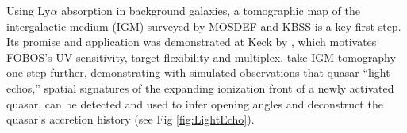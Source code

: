 Using Ly$\alpha$ absorption in background galaxies, a tomographic map
of the intergalactic medium (IGM) surveyed by MOSDEF and KBSS is a
key first step. Its promise and application was demonstrated at Keck
by \citet{lee14}, which motivates FOBOS's UV sensitivity, target
flexibility and multiplex. \citet{2018arXiv181005156S} take IGM
tomography one step further, demonstrating with simulated
observations that quasar ``light echos,'' spatial signatures of the
expanding ionization front of a newly activated quasar, can be
detected and used to infer opening angles and deconstruct the
quasar's accretion history (see Fig \ref{fig:LightEcho}).







%
%
%
%

